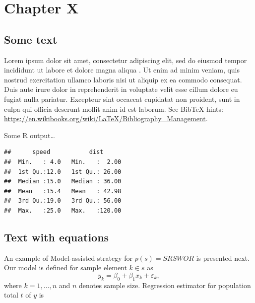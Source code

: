 \documentclass[12pt,a4paper]{article}
\begin{document}
\hypertarget{chapter-x}{%
\section{Chapter X}\label{chapter-x}}

\hypertarget{some-text}{%
\subsection{Some text}\label{some-text}}

Lorem ipsum dolor sit amet, consectetur adipiscing elit, sed do eiusmod
tempor incididunt ut labore et dolore magna aliqua
\citep{rao_making_2020, beaumont_jean-francois_ask_2021}. Ut enim ad
minim veniam, quis nostrud exercitation ullamco laboris nisi
\citet{sarndal_model_1992} ut aliquip ex ea commodo consequat. Duis aute
irure dolor in reprehenderit in voluptate velit esse cillum dolore eu
fugiat nulla pariatur. Excepteur sint occaecat cupidatat non proident,
sunt in culpa
\citet{sakshaug_sequential_2019, schork_survey_2021, bethlehem_article_2009}
qui officia deserunt mollit anim id est laborum. See BibTeX hints:
\url{https://en.wikibooks.org/wiki/LaTeX/Bibliography_Management}.

Some R output\ldots

\begin{verbatim}
##      speed           dist       
##  Min.   : 4.0   Min.   :  2.00  
##  1st Qu.:12.0   1st Qu.: 26.00  
##  Median :15.0   Median : 36.00  
##  Mean   :15.4   Mean   : 42.98  
##  3rd Qu.:19.0   3rd Qu.: 56.00  
##  Max.   :25.0   Max.   :120.00
\end{verbatim}


\hypertarget{Txt-with-eq}{%
\subsection{Text with equations}\label{Txt-with-eq}}

An example of Model-assisted strategy for $p(s)=SRSWOR$ is presented next. Our model is defined for sample element $k \in s$ as
\begin{equation}
 y_k = \beta_0 + \beta_1 x_k + \varepsilon_k,
\end{equation}
where $k = 1, \ldots, n$ and $n$ denotes sample size. 
Regression estimator for population total $t$ of $y$ is
\end{document}
